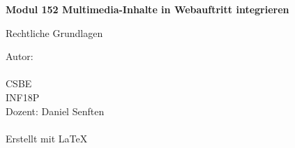 
\begin{titlepage}
    \begin{center}
        \vspace*{2.5cm}

        \Huge
        \textbf{Modul 152 Multimedia-Inhalte in Webauftritt integrieren}

        \vspace{0.5cm}
        \LARGE
        Rechtliche Grundlagen

        \vfill


        \vspace{0.8cm}

        \Large
        Autor: \gitAuthorName\\
        \gitAuthorEmail\\
        CSBE\\
        INF18P\\
        Dozent: Daniel Senften\\
        \gitAuthorDate\\
        \small
        \vspace{1cm}
        Erstellt mit \LaTeX\\
        \vspace{1cm}
        \gitStyler
    \end{center}
\end{titlepage}